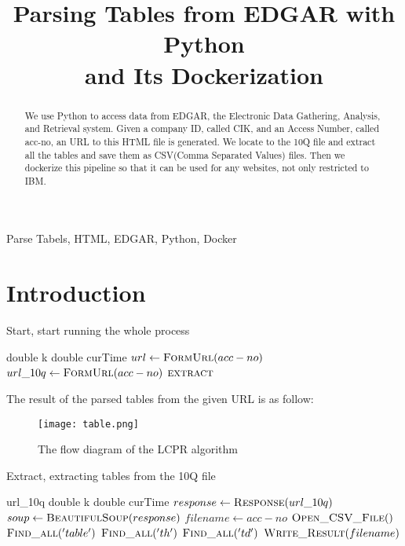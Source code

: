 \documentclass[conference]{IEEEtran}
\begin{document}
\title{Parsing Tables from EDGAR with Python \\and Its Dockerization}
%
\author{
}
\maketitle
\begin{abstract}
We use Python to access data from EDGAR, the Electronic Data Gathering, Analysis, and Retrieval system. Given a company ID, called CIK, and an Access Number, called acc-no, an URL to this HTML file is generated. We locate to the 10Q file and extract all the tables and save them as CSV(Comma Separated Values) files. Then we dockerize this pipeline so that it can be used for any websites, not only restricted to IBM.
\end{abstract}
\begin{keywords}
Parse Tabels, HTML, EDGAR, Python, Docker
\end{keywords}
\IEEEpeerreviewmaketitle
%
\section{Introduction}\label{i}
\indent 
\begin{algorithm}\label{start}
\caption{Start, start running the whole process}
\begin{algorithmic}[1]
	\Ensure double k
	 {double curTime}
		\State $url \gets \Call {FormUrl}{acc-no}$
		\State $url\_10q \gets \Call {FormUrl}{acc-no}$
		\State $\Call {extract}{}$
	\EndFunction
\end{algorithmic}
\end{algorithm}
\indent The result of the parsed tables from the given URL is as follow:
\begin{figure*}
\texttt{[image: table.png]}
\caption{The flow diagram of the LCPR algorithm}\label{data}
\end{figure*}
%
\begin{algorithm}\label{extract}
\caption{Extract, extracting tables from the 10Q file}
\begin{algorithmic}[1]
	\Require url\_10q
	\Ensure double k			
	 {double curTime}
		\State $response \gets \Call {Response}{url\_10q}$
		\State $soup \gets \Call {BeautifulSoup}{response}$
		\State $filename \gets acc-no$
		\State $\Call {Open\_CSV\_File}$
			\For $\Call {Find\_all}{'table'}$
				\For $\Call {Find\_all}{'th'}$
					\For $\Call {Find\_all}{'td'}$
						\State $\Call {Write\_Result}{filename}$
					\EndFor
				\EndFor
			\EndFor
	\EndFunction
\end{algorithmic}
\end{algorithm}
%
\end{document}
